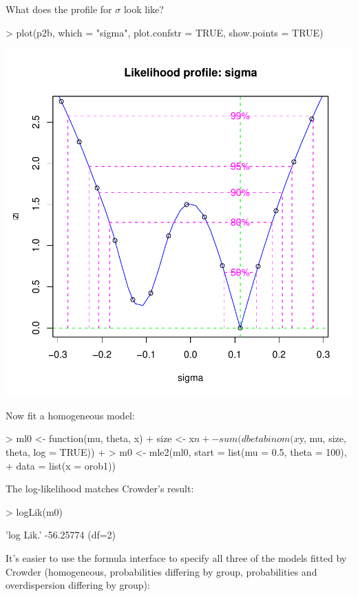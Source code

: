 \documentclass{article}
\begin{document}
What does the profile for $\sigma$ look like?
\begin{Schunk}
\begin{Sinput}
> plot(p2b, which = "sigma", plot.confstr = TRUE, show.points = TRUE)
\end{Sinput}
\end{Schunk}
\includegraphics{mle2-026}

Now fit a homogeneous model:
\begin{Schunk}
\begin{Sinput}
> ml0 <- function(mu, theta, x) {
+     size <- x$n
+     -sum(dbetabinom(x$y, mu, size, theta, log = TRUE))
+ }
> m0 <- mle2(ml0, start = list(mu = 0.5, theta = 100), 
+     data = list(x = orob1))
\end{Sinput}
\end{Schunk}

The log-likelihood matches Crowder's result:
\begin{Schunk}
\begin{Sinput}
> logLik(m0)
\end{Sinput}
\begin{Soutput}
'log Lik.' -56.25774 (df=2)
\end{Soutput}
\end{Schunk}

It's easier to 
use the formula interface
to specify all three of the models
fitted by Crowder (homogeneous, probabilities differing
by group, probabilities and overdispersion differing
by group):
\end{document}
